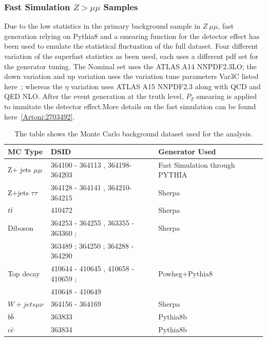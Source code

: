 \subsubsection{Fast Simulation $Z > \mu\mu$  Samples}
\label{sec:fastsimulation}
Due to the low statistics in the primary background sample in  $Z \> \mu \mu$, fast generation relying on Pythia8 and a smearing function for the detector effect has been used to emulate the statistical fluctuation of the full dataset. Four different variation of the superfast statistics as been used, each uses a different pdf set for the generator tuning. The Nominal set uses the ATLAS A14 NNPDF2.3LO; the down variation and up variation uses the variation tune parameters Var3C listed
here~\cite{ATL-PHYS-PUB-2014-021}; whereas the $\eta$ variation uses ATLAS A15 NNPDF2.3 along with QCD and QED NLO. After the event generation at the truth level, $P_{T}$ smearing is applied to immitate the detector effect.More details on the fast simulation can be found here~\ref{Artoni:2703492}.

\begin{table}[!htb]
    \begin{center}
    \caption{
        The table shows the Monte Carlo background dataset used for the analysis. 
    \label{table:MC}
    }
\label{tab:MC samples}
\begin{tabular}{|l|l|l|}
\hline
\textbf{MC Type}   & \textbf{DSID}                                                         &\textbf{Generator Used}\\ \hline
Z+ jets $\mu\mu$   & 364100 - 364113 , 364198-364203                                       &Fast Simulation through PYTHIA\\ \hline
Z+jets $\tau \tau$ & 364128 - 364141 , 364210-364215                                       &Sherpa\\ \hline
$t\bar{t}$         & 410472                                                                &Sherpa\\ \hline
Diboson            & 364253 - 364255 , 363355 - 363360 ; &Sherpa \\
& 363489 ; 364250 ; 364288 - 364290 & \\ \hline
Top decay          & 410644 - 410645 , 410658 - 410659 ;                   &Powheg+Pythia8\\ 
&410648 - 410649 & \\ \hline
$W + jets \mu\nu$  & 364156 - 364169                                                       &Sherpa\\ \hline
$b\bar{b}$         & 363833                                                                &Pythia8b\\ \hline
$c\bar{c}$         & 363834                                                                &Pythia8b\\ \hline
\end{tabular}
\end{center}
\end{table}


